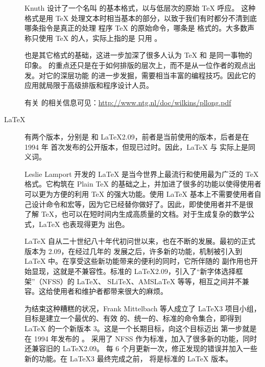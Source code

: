 \begin{description}
  \item[\PlainTeX] Knuth 设计了一个名叫 \PlainTeX{} 的基本格式，以与低层次的原始 \TeX{} 呼应。
    这种格式是用 \TeX{} 处理文本时相当基本的部分，以致于我们有时都分不清到底哪条指令是真正的处理
    程序 \TeX{} 的原始命令，哪条是 \PlainTeX{} 格式的。大多数声称只使用 \TeX{} 的人，实际上指的是
    只用 \PlainTeX{}。

    \PlainTeX{} 也是其它格式的基础，这进一步加深了很多人认为 \TeX{} 和 \PlainTeX{} 是同一事物的
    印象。\PlainTeX{} 的重点还只是在于如何排版的层次上，而不是从一位作者的观点出发。对它的深层功能
    的进一步发掘，需要相当丰富的编程技巧。因此它的应用就局限于高级排版和程序设计人员。

    有关 \PlainTeX{} 的相关信息可见：\url{http://www.ntg.nl/doc/wilkins/pllong.pdf}

  \item[\LaTeX] 有两个版本，分别是 \LaTeXe{} 和 \LaTeX2.09，前者是当前使用的版本，后者是在 1994 年
    首次发布的公开版本，但现已过时。因此，\LaTeX{} 与 \LaTeXe{} 实际上是同义词。

    Leslie Lamport 开发的 \LaTeX{} 是当今世界上最流行和使用最为广泛的 \TeX{} 格式。它构筑在 Plain
    \TeX{} 的基础之上，并加进了很多的功能以使得使用者可以更为方便的利用 \TeX{} 的强大功能。使用
    \LaTeX{} 基本上不需要使用者自己设计命令和宏等，因为它已经替你做好了。因此，即使使用者并不是很
    了解 \TeX{}，也可以在短时间内生成高质量的文档。对于生成复杂的数学公式，\LaTeX{} 也表现得更为
    出色。

    \LaTeX{} 自从二十世纪八十年代初问世以来，也在不断的发展。最初的正式版本为 2.09，在经过几年的
    发展之后，许多新的功能，机制被引入到 \LaTeX{} 中。在享受这些新功能带来的便利的同时，它所伴随的
    副作用也开始显现，这就是不兼容性。标准的 \LaTeX2.09，引入了“新字体选择框架”（NFSS）的 \LaTeX{}、
    SLiTeX、AMSLaTeX 等等，相互之间并不兼容。这给使用者和维护者都带来很大的麻烦。

    为结束这种糟糕的状况，Frank Mittelbach 等人成立了 \LaTeX3 项目小组，目标是建立一个最优的、有效
    的、统一的、标准的命令集合，即得到 \LaTeX{} 的一个新版本 3。这是一个长期目标，向这个目标迈出
    第一步就是在 1994 年发布的 \LaTeXe{}。\LaTeXe{} 采用了 NFSS 作为标准，加入了很多新的功能，同时
    还兼容旧的 \LaTeX2.09。\LaTeXe{} 每 6 个月更新一次，修正发现的错误并加入一些新的功能。在
    \LaTeX3 最终完成之前，\LaTeXe{} 将是标准的 \LaTeX{} 版本。


\end{description}
